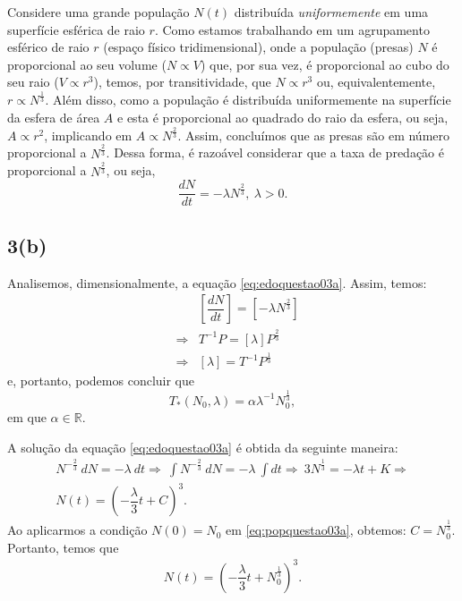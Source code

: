 Considere uma grande população \(N(t)\) distribuída \textit{uniformemente} em uma superfície esférica de raio \(r\). Como estamos trabalhando em um agrupamento esférico de raio \(r\) (espaço físico tridimensional), onde a população (presas) \(N\) é proporcional ao seu volume (\(N \propto V\)) que, por sua vez, é proporcional ao cubo do seu raio (\(V \propto r^3\)), temos, por transitividade, que \(N \propto r^3\) ou, equivalentemente, \(r \propto N^{\frac{1}{3}}\). Além disso, como a população é distribuída uniformemente na superfície da esfera de área \(A\) e esta é proporcional ao quadrado do raio da esfera, ou seja, \(A \propto r^2\), implicando em \(A \propto N^{\frac{2}{3}}\). Assim, concluímos que as presas são em número proporcional a \(N^{\frac{2}{3}}\). Dessa forma, é razoável considerar que a taxa de predação é proporcional a \(N^{\frac{2}{3}}\), ou seja,
\begin{equation}\label{eq:edoquestao03a}
\dfrac{dN}{dt} = -\lambda N^{\frac{2}{3}},\ \lambda > 0.
\end{equation}



\subsection*{3(b)}


Analisemos, dimensionalmente, a equação
\eqref{eq:edoquestao03a}. Assim, temos: 
\[
\begin{array}{rcl}
& &\left[\dfrac{dN}{dt}\right] = \left[-\lambda N^{\frac{2}{3}}\right] \\
&\Rightarrow& T^{-1} P = [\lambda] P^{\frac{2}{3}} \\
&\Rightarrow& [\lambda] = T^{-1} P^{\frac{1}{3}}
\end{array}\]
e, portanto, podemos concluir que
\begin{equation}\label{eq:tempomedioprova03q03}
T_\ast(N_0,\lambda) = \alpha \lambda^{-1} N_0^{\frac{1}{3}},    
\end{equation}
em que \(\alpha \in \mathbb{R}\).

A solução da equação \eqref{eq:edoquestao03a} é obtida da seguinte maneira:
\begin{eqnarray}
N^{-\frac{2}{3}} \ dN = -\lambda\ dt
\Rightarrow\
\int N^{-\frac{2}{3}} \ dN = -\lambda\ \int dt
\Rightarrow\
3 N^{\frac{1}{3}} = -\lambda t + K
\Rightarrow \nonumber \\
\label{eq:popquestao03a}
N(t) = \left(-\dfrac{\lambda}{3} t + C\right)^3.
\end{eqnarray}
Ao aplicarmos a condição \(N(0) = N_0\) em \eqref{eq:popquestao03a}, obtemos: \(C = N_0^{\frac{1}{3}}\).
Portanto, temos que
\begin{eqnarray}\label{eq:edoquestao03b}
N(t) = \left(-\dfrac{\lambda}{3} t + N_0^{\frac{1}{3}}\right)^3.
\end{eqnarray}

